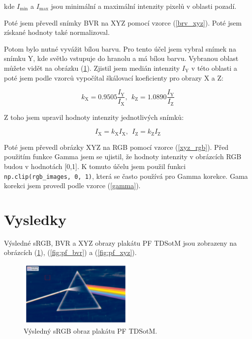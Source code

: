 \documentclass[a4paper,11pt,twocolumn]{article}
\begin{document}
        kde $I_{\text{min}}$ a $I_{\text{max}}$ jsou minimální a maximální intenzity pixelů v oblasti pozadí.

        Poté jsem převedl snímky BVR na XYZ pomocí vzorce (\ref{brv_xyz}).  Poté jsem získané hodnoty také normalizoval. 
        
        Potom bylo nutné vyvážit bílou barvu. Pro tento účel jsem vybral snímek na snímku Y, kde světlo vstupuje do hranolu a má bílou barvu. Vybranou oblast můžete vidět na obrázku (\ref{fig:pf_srgb}). Zjistil jsem medián intenzity $I_{\text{Y}}$ v této oblasti a poté jsem podle vzorců vypočítal škálovací koeficienty pro obrazy X a Z: 

        \begin{equation}
                k_{\text{X}} = 0.9505 \frac{I_{\text{Y}}}{I_{\text{X}}}, ~~
                k_{\text{Z}} = 1.0890 \frac{I_{\text{Y}}}{I_{\text{Z}}}
        \end{equation}

        Z toho jsem upravil hodnoty intenzity jednotlivých snímků: 

        \begin{equation}
            I_{\text{X}} = k_{\text{X}} I_{\text{X}}, ~~
            I_{\text{Z}} = k_{\text{Z}} I_{\text{Z}}
        \end{equation}

        Poté jsem převedl obrázky XYZ na RGB pomocí vzorce (\ref{xyz_rgb}). Před použitím funkce Gamma jsem se ujistil, že hodnoty intenzity v obrázcích RGB budou v hodnotách [0,1]. K tomuto účelu jsem použil funkci \texttt{np.clip(rgb\_images, 0, 1)}, která se často používá pro Gamma korekce. Gama korekci jsem provedl podle vzorce (\ref{gamma}).

    \section{Vysledky}
        Výsledné sRGB, BVR a XYZ obrazy plakátu PF TDSotM jsou zobrazeny na obrázcích (\ref{fig:pf_srgb}), (\ref{fig:pf_bvr}) a (\ref{fig:pf_xyz}).
        
        \begin{figure}
            \centering
            \includegraphics[width=0.5\textwidth]{pf_srgb}
            \caption{Výsledný sRGB obraz plakátu PF TDSotM.}
            \label{fig:pf_srgb}
        \end{figure}
\end{document}
